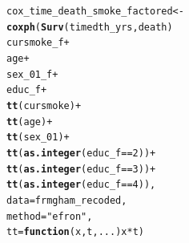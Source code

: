 \documentclass{article}\usepackage[]{graphicx}\usepackage[]{color}
\makeatletter
\newcommand{\hlnum}[1]{\textcolor[rgb]{0.686,0.059,0.569}{#1}}%
\newcommand{\hlstr}[1]{\textcolor[rgb]{0.192,0.494,0.8}{#1}}%
\newcommand{\hlopt}[1]{\textcolor[rgb]{0,0,0}{#1}}%
\newcommand{\hlstd}[1]{\textcolor[rgb]{0.345,0.345,0.345}{#1}}%
\newcommand{\hlkwa}[1]{\textcolor[rgb]{0.161,0.373,0.58}{\textbf{#1}}}%
\newcommand{\hlkwb}[1]{\textcolor[rgb]{0.69,0.353,0.396}{#1}}%
\newcommand{\hlkwc}[1]{\textcolor[rgb]{0.333,0.667,0.333}{#1}}%
\newcommand{\hlkwd}[1]{\textcolor[rgb]{0.737,0.353,0.396}{\textbf{#1}}}%
\newenvironment{kframe}{%
 \def\at@end@of@kframe{}%
 \ifinner\ifhmode%
  \def\at@end@of@kframe{\end{minipage}}%
  \begin{minipage}{\columnwidth}%
 \fi\fi%
 \def\FrameCommand##1{\hskip\@totalleftmargin \hskip-\fboxsep
 \colorbox{shadecolor}{##1}\hskip-\fboxsep
     \hskip-\linewidth \hskip-\@totalleftmargin \hskip\columnwidth}%
 \MakeFramed {\advance\hsize-\width
   \@totalleftmargin\z@ \linewidth\hsize
   \@setminipage}}%
 {\par\unskip\endMakeFramed%
 \at@end@of@kframe}
\newenvironment{knitrout}{}{} %
\makeatother
\begin{document}
\begin{knitrout}
\color{fgcolor}\begin{kframe}
\begin{alltt}
\hlstd{cox_time_death_smoke_factored} \hlkwb{<-}
  \hlkwd{coxph}\hlstd{(}\hlkwd{Surv}\hlstd{(timedth_yrs, death)} \hlopt{~}
          \hlstd{cursmoke_f} \hlopt{+}
          \hlstd{age} \hlopt{+}
          \hlstd{sex_01_f} \hlopt{+}
          \hlstd{educ_f} \hlopt{+}
          \hlkwd{tt}\hlstd{(cursmoke)} \hlopt{+}
          \hlkwd{tt}\hlstd{(age)} \hlopt{+}
          \hlkwd{tt}\hlstd{(sex_01)} \hlopt{+}
          \hlkwd{tt}\hlstd{(}\hlkwd{as.integer}\hlstd{(educ_f} \hlopt{==} \hlnum{2}\hlstd{))} \hlopt{+}
          \hlkwd{tt}\hlstd{(}\hlkwd{as.integer}\hlstd{(educ_f} \hlopt{==} \hlnum{3}\hlstd{))} \hlopt{+}
          \hlkwd{tt}\hlstd{(}\hlkwd{as.integer}\hlstd{(educ_f} \hlopt{==} \hlnum{4}\hlstd{)),}
        \hlkwc{data} \hlstd{= frmgham_recoded,}
        \hlkwc{method} \hlstd{=} \hlstr{"efron"}\hlstd{,}
        \hlkwc{tt} \hlstd{=} \hlkwa{function}\hlstd{(}\hlkwc{x}\hlstd{,}\hlkwc{t}\hlstd{,}\hlkwc{...}\hlstd{) x}\hlopt{*}\hlstd{t)}


\end{alltt}
\end{kframe}
\end{knitrout}
\end{document}
